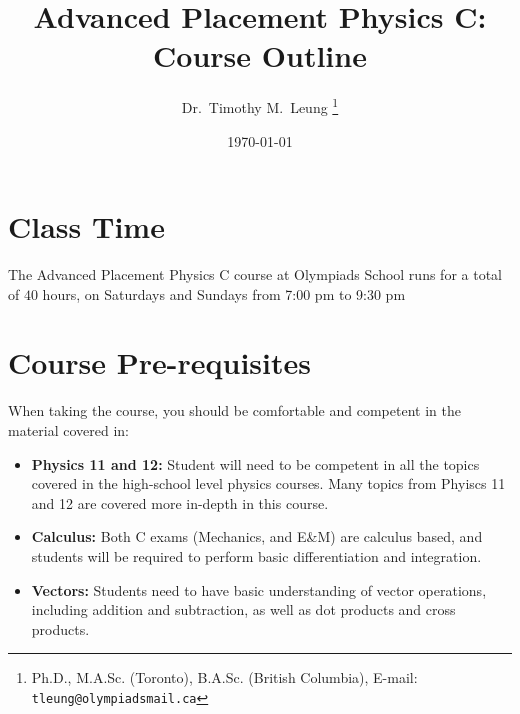 \documentclass{../../oss-handout}
\title{Advanced Placement Physics C: Course Outline}
\author{Dr.\ Timothy M.\ Leung
  \footnote{Ph.D., M.A.Sc. (Toronto), B.A.Sc. (British Columbia), E-mail:
    \texttt{tleung@olympiadsmail.ca}}
}
\date{\today}
\begin{document}
\thispagestyle{title}
\gentitle

\section*{Class Time}
The Advanced Placement Physics C course at Olympiads School runs for a total of
$40$ hours, on Saturdays and Sundays from 7:00 pm to  9:30 pm


\section*{Course Pre-requisites}
When taking the course, you should be comfortable and competent in the material
covered in:
\begin{itemize}[noitemsep,topsep=0pt,leftmargin=18pt]
\item\textbf{Physics 11 and 12:} Student will need to be competent in all the
  topics covered in the high-school level physics courses. Many topics from
  Phyiscs 11 and 12 are covered more in-depth in this course.
\item\textbf{Calculus:} Both C exams (Mechanics, and E\&M) are calculus based,
  and students will be required to perform basic differentiation and
  integration.
\item\textbf{Vectors:} Students need to have basic understanding of vector
  operations, including addition and subtraction, as well as dot products and
  cross products.
\end{itemize}
\end{document}
